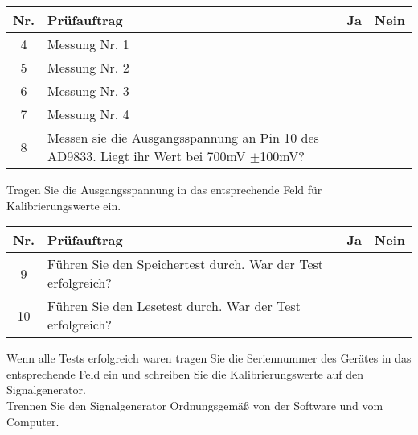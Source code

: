 \documentclass[a4paper,12pt]{article}
\begin{document}
\begin{flushleft}
	\begin{tabular}{|c||p{10cm}|c|c|}
		\hline
		Nr. & Prüfauftrag & Ja & Nein\\
		\hline
		4 & Messung Nr. 1 & & \\
		\hline
		5 & Messung Nr. 2 & & \\
		\hline
		6 & Messung Nr. 3 & & \\
		\hline
		7 & Messung Nr. 4 & & \\
		\hline
		8 & Messen sie die Ausgangsspannung an Pin 10 des AD9833. Liegt ihr Wert bei 700mV $\pm$100mV? & & \\
		\hline
	\end{tabular}
\end{flushleft}
Tragen Sie die Ausgangsspannung in das entsprechende Feld für Kalibrierungswerte ein.\\
\begin{flushleft}
	\begin{tabular}{|c||p{10cm}|c|c|}
		\hline
		Nr. & Prüfauftrag & Ja & Nein\\
		\hline
		9 & Führen Sie den Speichertest durch. War der Test erfolgreich? & & \\
		\hline
		10 & Führen Sie den Lesetest durch. War der Test erfolgreich? & & \\
		\hline
	\end{tabular}
\end{flushleft}
Wenn alle Tests erfolgreich waren tragen Sie die Seriennummer des Gerätes in das entsprechende Feld ein und schreiben Sie die Kalibrierungswerte auf den Signalgenerator.\\
Trennen Sie den Signalgenerator Ordnungsgemäß von der Software und vom Computer.
\end{document}
